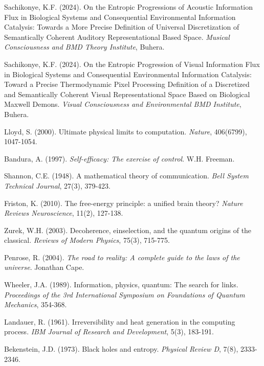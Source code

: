 \documentclass[11pt,a4paper]{article}
\theoremstyle{remark}
\begin{document}
\begin{thebibliography}{99}
Sachikonye, K.F. (2024). On the Entropic Progressions of Acoustic Information Flux in Biological Systems and Consequential Environmental Information Catalysis: Towards a More Precise Definition of Universal Discretization of Semantically Coherent Auditory Representational Based Space. \textit{Musical Consciousness and BMD Theory Institute}, Buhera.

Sachikonye, K.F. (2024). On the Entropic Progression of Visual Information Flux in Biological Systems and Consequential Environmental Information Catalysis: Toward a Precise Thermodynamic Pixel Processing Definition of a Discretized and Semantically Coherent Visual Representational Space Based on Biological Maxwell Demons. \textit{Visual Consciousness and Environmental BMD Institute}, Buhera.

Lloyd, S. (2000). Ultimate physical limits to computation. \textit{Nature}, 406(6799), 1047-1054.

Bandura, A. (1997). \textit{Self-efficacy: The exercise of control}. W.H. Freeman.

Shannon, C.E. (1948). A mathematical theory of communication. \textit{Bell System Technical Journal}, 27(3), 379-423.

Friston, K. (2010). The free-energy principle: a unified brain theory? \textit{Nature Reviews Neuroscience}, 11(2), 127-138.

Zurek, W.H. (2003). Decoherence, einselection, and the quantum origins of the classical. \textit{Reviews of Modern Physics}, 75(3), 715-775.

Penrose, R. (2004). \textit{The road to reality: A complete guide to the laws of the universe}. Jonathan Cape.

Wheeler, J.A. (1989). Information, physics, quantum: The search for links. \textit{Proceedings of the 3rd International Symposium on Foundations of Quantum Mechanics}, 354-368.

Landauer, R. (1961). Irreversibility and heat generation in the computing process. \textit{IBM Journal of Research and Development}, 5(3), 183-191.

Bekenstein, J.D. (1973). Black holes and entropy. \textit{Physical Review D}, 7(8), 2333-2346.


\end{thebibliography}
\end{document}
